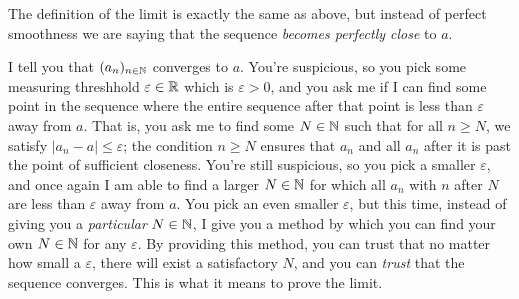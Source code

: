 \documentclass[11pt]{article}
\begin{document}
The definition of the limit is exactly the same as above, but instead of perfect smoothness we are saying that the sequence \emph{becomes perfectly close} to $a$.

I tell you that $(a_n)_{n \in \mathbb{N}}$ converges to $a$. You're suspicious, so you pick some measuring threshhold $\varepsilon \in \mathbb{R}$ which is $\varepsilon > 0$, and you ask me if I can find some point in the sequence where the entire sequence after that point is less than $\varepsilon$ away from $a$. That is, you ask me to find some $N \in \mathbb{N}$ such that for all $n \ge N$, we satisfy $|a_n - a| \le \varepsilon$; the condition $n \ge N$ ensures that $a_n$ and all $a_n$ after it is past the point of sufficient closeness. You're still suspicious, so you pick a smaller $\varepsilon$, and once again I am able to find a larger $N \in \mathbb{N}$ for which all $a_n$ with $n$ after $N$ are less than $\varepsilon$ away from $a$. You pick an even smaller $\varepsilon$, but this time, instead of giving you a \emph{particular} $N\in \mathbb{N}$, I give you a method by which you can find your own $N \in \mathbb{N}$ for any $\varepsilon$. By providing this method, you can trust that no matter how small a $\varepsilon$, there will exist a satisfactory $N$, and you can \emph{trust} that the sequence converges. This is what it means to prove the limit.
\end{document}
